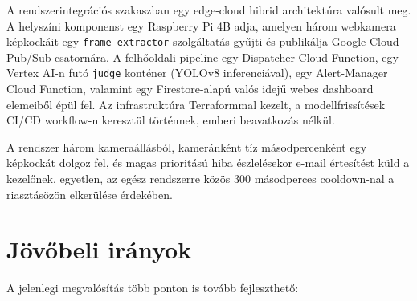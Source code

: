 A rendszerintegrációs szakaszban egy edge-cloud hibrid architektúra valósult meg. A helyszíni komponenst
egy Raspberry Pi 4B adja, amelyen három webkamera képkockáit egy \texttt{frame-extractor} szolgáltatás
gyűjti és publikálja Google Cloud Pub/Sub csatornára. A felhőoldali pipeline egy Dispatcher Cloud Function,
egy Vertex AI-n futó \texttt{judge} konténer (YOLOv8 inferenciával), egy Alert-Manager Cloud Function,
valamint egy Firestore-alapú valós idejű webes dashboard elemeiből épül fel. Az infrastruktúra
Terraformmal kezelt, a modellfrissítések CI/CD workflow-n keresztül történnek, emberi beavatkozás nélkül.

A rendszer három kameraállásból, kameránként tíz másodpercenként egy képkockát dolgoz fel, és magas prioritású hiba
észlelésekor e-mail értesítést küld a kezelőnek, egyetlen, az egész rendszerre közös 300 másodperces cooldown-nal a riasztásözön
elkerülése érdekében.

\section{Jövőbeli irányok}

A jelenlegi megvalósítás több ponton is tovább fejleszthető:

